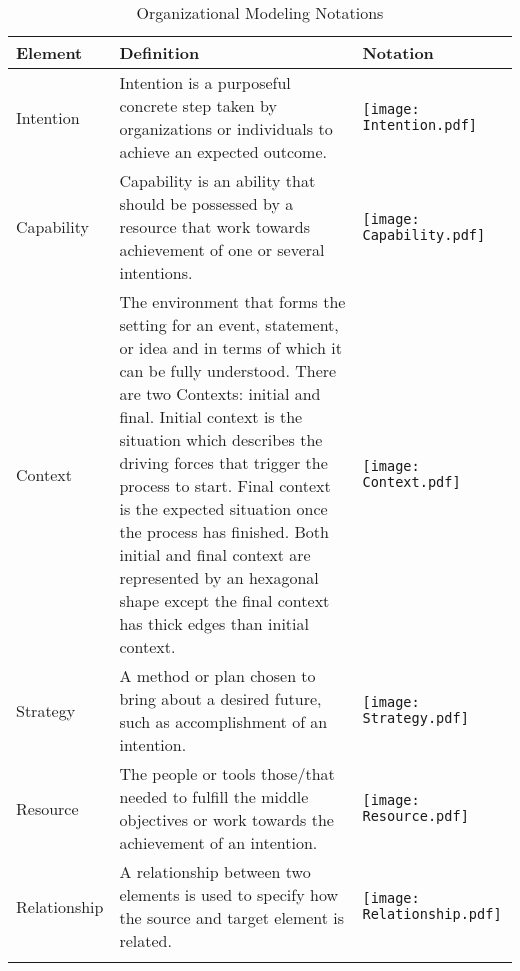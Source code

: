 \begin{center}
	\begin{longtable}{p{3cm}p{10cm}p{3cm}}
		\toprule 
		\textbf{Element} & \textbf{Definition} & \textbf{Notation} \\
		\midrule
		\endfirsthead
		Intention 			& Intention is a purposeful concrete step taken by organizations or individuals to achieve an expected outcome. & \begin{center} \texttt{[image: Intention.pdf]}  \end{center}  \\
		
		Capability	&  Capability is an ability that should be possessed by a resource that work towards achievement of one or several intentions.   & \begin{center} \texttt{[image: Capability.pdf]} \end{center}  \\
		
		Context				& The environment that forms the setting for an event, statement, or idea and in terms of which it can be fully understood. There are two Contexts: initial and final. Initial context is the situation which describes the driving forces that trigger the process to start. Final context is the expected situation once the process has finished. Both initial and final context are represented by an hexagonal shape except the final context has thick edges than initial context.  & \begin{center} \texttt{[image: Context.pdf]} \end{center}   \\
		\newline
		Strategy		& \newline  A method or plan chosen to bring about a desired future, such as accomplishment of an intention.   & \begin{center} \texttt{[image: Strategy.pdf]} \end{center}  \\
		
		Resource					& The people or tools those/that needed to fulfill the middle objectives or work towards the achievement of an intention. & \begin{center} \texttt{[image: Resource.pdf]} \end{center}  \\
		
		Relationship				& A relationship between two elements is used to specify how the source and target element is related.  & \begin{center} \texttt{[image: Relationship.pdf]} \end{center}   \\
		
		\bottomrule
		\caption{Organizational Modeling Notations}
		\label{tab:notations}		
	\end{longtable}	
\end{center}

